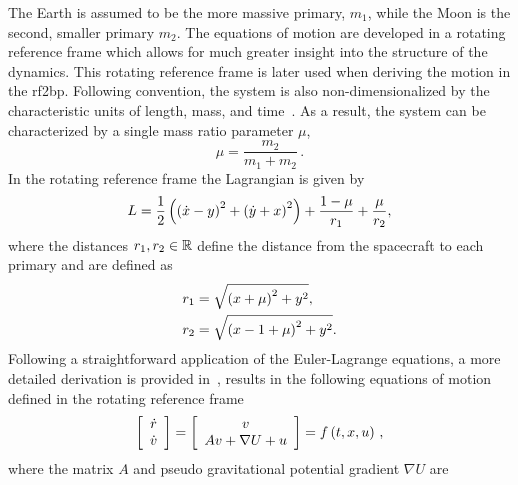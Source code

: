 The Earth is assumed to be the more massive primary, \( m_1 \), while the Moon is the second, smaller primary \( m_2\).
The equations of motion are developed in a rotating reference frame which allows for much greater insight into the structure of the dynamics.
This rotating reference frame is later used when deriving the motion in the \gls{rf2bp}.
Following convention, the system is also non-dimensionalized by the characteristic units of length, mass, and time~\cite{koon2011}.
As a result, the system can be characterized by a single mass ratio parameter \( \mu \),
\begin{equation}
        \mu = \frac{m_2}{m_1+m_2} \, .
        \label{eq:mass_param}
\end{equation}
In the rotating reference frame the Lagrangian is given by
\begin{equation}\label{eq:pcrtb_lagrangian}
    L = \frac{1}{2} \left( \left( \dot{x} - y \right)^2 + \left( \dot{y} + x \right)^2 \right) + \frac{1 - \mu}{r_1} + \frac{\mu}{r_2},
\end{equation}
where the distances \( r_1, r_2 \in \mathbb{R} \) define the distance from the spacecraft to each primary and are defined as
\begin{align}
    r_1 &= \sqrt{\left( x + \mu \right)^2 + y^2} , \\
    r_2 &= \sqrt{\left( x -1 + \mu \right)^2 + y^2} .
\end{align}
Following a straightforward application of the Euler-Lagrange equations, a more detailed derivation is provided in~\cite{szebehely1967}, results in the following equations of motion defined in the rotating reference frame
\begin{equation}\label{eqn:cont_dyn}
        \left[\begin{array}{c} \dot{r} \\ \dot{v} \end{array} \right] = 
        \left[ \begin{array}{c} v \\ A v + \nabla U + u \end{array} \right] = f\left( t,x, u\right) \, ,
\end{equation}
where the matrix \( A \) and pseudo gravitational potential gradient \( \nabla U\) are
